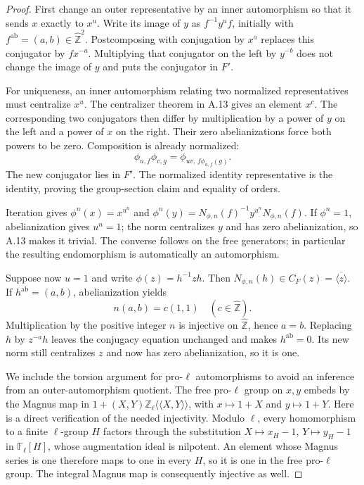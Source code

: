 \begin{proof}
First change an outer representative by an inner automorphism
so that it sends $x$ exactly to $x^u$. Write its image of $y$
as $f^{-1}y^u f$, initially with
$f^{\mathrm{ab}}=(a,b)\in\widehat{\mathbb Z}^2$.
Postcomposing with conjugation by $x^a$ replaces this
conjugator by $fx^{-a}$. Multiplying that conjugator on the
left by $y^{-b}$ does not change the image of $y$ and puts
the conjugator in $F'$.

For uniqueness, an inner automorphism relating two normalized
representatives must centralize $x^u$. The centralizer theorem
in A.13 gives an element $x^c$. The corresponding two
conjugators then differ by multiplication by a power of $y$
on the left and a power of $x$ on the right. Their zero
abelianizations force both powers to be zero. Composition
is already normalized:
\[
        \phi_{u,f}\phi_{v,g}
          =\phi_{uv,\,f\phi_{u,f}(g)}.
\]
The new conjugator lies in $F'$. The normalized identity
representative is the identity, proving the group-section
claim and equality of orders.

Iteration gives
$\phi^n(x)=x^{u^n}$ and
$\phi^n(y)=N_{\phi,n}(f)^{-1}y^{u^n}N_{\phi,n}(f)$.
If $\phi^n=1$, abelianization gives $u^n=1$; the norm
centralizes $y$ and has zero abelianization, so A.13 makes
it trivial. The converse follows on the free generators;
in particular the resulting endomorphism is automatically
an automorphism.

Suppose now $u=1$ and write $\phi(z)=h^{-1}zh$.
Then $N_{\phi,n}(h)\in C_F(z)=\overline{\langle z\rangle}$.
If $h^{\mathrm{ab}}=(a,b)$, abelianization yields
\[
                    n(a,b)=c(1,1)
                    \quad(c\in\widehat{\mathbb Z}).
\]
Multiplication by the positive integer $n$ is injective on
$\widehat{\mathbb Z}$, hence $a=b$. Replacing $h$ by
$z^{-a}h$ leaves the conjugacy equation unchanged and makes
$h^{\mathrm{ab}}=0$. Its new norm still centralizes $z$
and now has zero abelianization, so it is one.

We include the torsion argument for pro-$\ell$ automorphisms
to avoid an inference from an outer-automorphism quotient.
The free pro-$\ell$ group on $x,y$ embeds by the Magnus map
in
$1+(X,Y)\mathbb Z_\ell\langle\!\langle X,Y\rangle\!\rangle$,
with $x\mapsto1+X$ and $y\mapsto1+Y$.
Here is a direct verification of the needed injectivity.
Modulo $\ell$, every homomorphism to a finite $\ell$-group
$H$ factors through the substitution
$X\mapsto x_H-1$, $Y\mapsto y_H-1$ in
$\mathbb F_\ell[H]$, whose augmentation ideal is nilpotent.
An element whose Magnus series is one therefore maps to
one in every $H$, so it is one in the free pro-$\ell$ group.
The integral Magnus map is consequently injective as well.


\end{proof}
